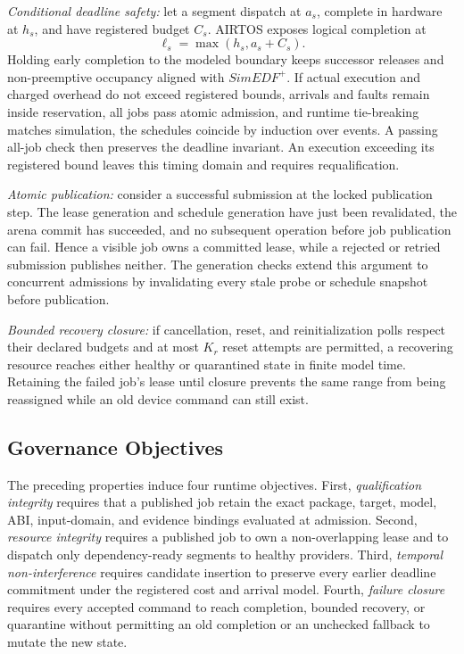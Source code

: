 \documentclass[lettersize,journal]{IEEEtran}
\begin{document}
\textit{Conditional deadline safety:} let a segment dispatch at $a_s$,
complete in hardware at $h_s$, and have registered budget $C_s$. AIRTOS exposes
logical completion at
\begin{equation}
\ell_s=\max(h_s,a_s+C_s).
\label{eq:logical}
\end{equation}
Holding early completion to the modeled boundary keeps successor releases and
non-preemptive occupancy aligned with $SimEDF^+$. If actual execution and
charged overhead do not exceed registered bounds, arrivals and faults remain
inside reservation, all jobs pass atomic admission, and runtime tie-breaking
matches simulation, the schedules coincide by induction over events. A passing
all-job check then preserves the deadline invariant. An execution exceeding its
registered bound leaves this timing domain and requires requalification.

\textit{Atomic publication:} consider a successful submission at the locked
publication step. The lease generation and schedule generation have just been
revalidated, the arena commit has succeeded, and no subsequent operation before
job publication can fail. Hence a visible job owns a committed lease, while a
rejected or retried submission publishes neither. The generation checks extend
this argument to concurrent admissions by invalidating every stale probe or
schedule snapshot before publication.

\textit{Bounded recovery closure:} if cancellation, reset, and reinitialization
polls respect their declared budgets and at most $K_r$ reset attempts are
permitted, a recovering resource reaches either healthy or quarantined state in
finite model time. Retaining the failed job's lease until closure prevents the
same range from being reassigned while an old device command can still exist.

\subsection{Governance Objectives}
The preceding properties induce four runtime objectives. First,
\emph{qualification integrity} requires that a published job retain the exact
package, target, model, ABI, input-domain, and evidence bindings evaluated at
admission. Second, \emph{resource integrity} requires a published job to own a
non-overlapping lease and to dispatch only dependency-ready segments to healthy
providers. Third, \emph{temporal non-interference} requires candidate insertion
to preserve every earlier deadline commitment under the registered cost and
arrival model. Fourth, \emph{failure closure} requires every accepted command
to reach completion, bounded recovery, or quarantine without permitting an
old completion or an unchecked fallback to mutate the new state.
\end{document}
